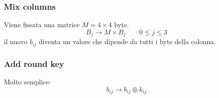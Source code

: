 \subsubsection{Mix columns}

Viene fissata una matrice $M = 4 \times 4$ byte.\
\[B_j \rightarrow M \times B_j\qquad 0\leq j\leq 3\]
il nuovo $b_{ij}$ diventa un valore che dipende da tutti i byte della colonna.\

\subsubsection{Add round key}

Molto semplice:
\[b_{ij} \rightarrow b_{ij} \oplus k_{ij}\]
